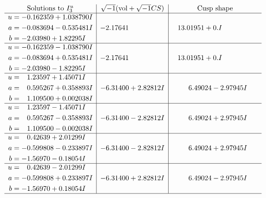 \documentclass[1p]{elsarticle_modified}
\theoremstyle{definition}
\newcommand{\I}{\sqrt{-1}}
\begin{document}
$$\begin{array}{c|c|c}  
\text{Solutions to }I^u_{3}& \I (\text{vol} + \sqrt{-1}CS) & \text{Cusp shape}\\
 \hline 
\begin{aligned}
u &= -0.162359 + 1.038790 I \\
a &= -0.083694 - 0.535481 I \\
b &= -2.03980 + 1.82295 I\end{aligned}
 & -2.17641\phantom{ +0.000000I} & \phantom{-}13.01951 + 0. I\phantom{ +0.000000I} \\ \hline\begin{aligned}
u &= -0.162359 - 1.038790 I \\
a &= -0.083694 + 0.535481 I \\
b &= -2.03980 - 1.82295 I\end{aligned}
 & -2.17641\phantom{ +0.000000I} & \phantom{-}13.01951 + 0. I\phantom{ +0.000000I} \\ \hline\begin{aligned}
u &= \phantom{-}1.23597 + 1.45071 I \\
a &= \phantom{-}0.595267 + 0.358893 I \\
b &= \phantom{-}1.109500 + 0.002038 I\end{aligned}
 & -6.31400 + 2.82812 I & \phantom{-}6.49024 - 2.97945 I \\ \hline\begin{aligned}
u &= \phantom{-}1.23597 - 1.45071 I \\
a &= \phantom{-}0.595267 - 0.358893 I \\
b &= \phantom{-}1.109500 - 0.002038 I\end{aligned}
 & -6.31400 - 2.82812 I & \phantom{-}6.49024 + 2.97945 I \\ \hline\begin{aligned}
u &= \phantom{-}0.42639 + 2.01299 I \\
a &= -0.599808 - 0.233897 I \\
b &= -1.56970 - 0.18054 I\end{aligned}
 & -6.31400 - 2.82812 I & \phantom{-}6.49024 + 2.97945 I \\ \hline\begin{aligned}
u &= \phantom{-}0.42639 - 2.01299 I \\
a &= -0.599808 + 0.233897 I \\
b &= -1.56970 + 0.18054 I\end{aligned}
 & -6.31400 + 2.82812 I & \phantom{-}6.49024 - 2.97945 I\\
 \hline 
 \end{array}$$\newpage\newpage\renewcommand{\arraystretch}{1}
\end{document}
